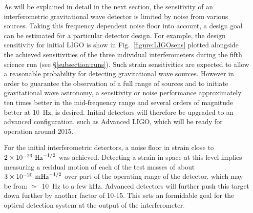 \documentclass{article}
\begin{document}
As will be explained in detail in the next section, the sensitivity of an
interferometric gravitational wave detector is limited by noise from various
sources. Taking this frequency dependent noise floor into account, a design goal
can be estimated for a particular detector design. For example, the design
sensitivity for initial LIGO is show in Fig.~\ref{figure:LIGOsens} plotted
alongside the achieved sensitivities of the three individual interferometers
during the fifth science run (see \S\ref{subsection:runs}). Such strain
sensitivities are expected to allow a reasonable probability for detecting
gravitational wave sources. However in order to guarantee the observation
of a full range of sources and to initiate gravitational wave astronomy, a
sensitivity or noise performance approximately ten times better in the
mid-frequency range and several orders of magnitude better at 10~Hz, is desired.
Initial detectors will therefore be upgraded to an advanced configuration, such
as Advanced LIGO, which will be ready for operation around 2015.


For the initial interferometric detectors, a noise floor in strain close to $2
\times 10^{-23}~{\rm Hz}^{-1/2}$ was achieved. Detecting a strain in space at
this level implies measuring a residual motion of each of the test masses of
about $3 \times 10^{-20}~{\rm m}{\rm Hz}^{-1/2}$ over part of the operating
range of the detector, which may be from $\simeq$~10~Hz to a few kHz. Advanced
detectors will further push this target down further by another factor of 10-15.
This sets an formidable goal for the optical detection system at the output of
the interferometer.
\end{document}
